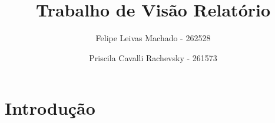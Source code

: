 \documentclass{article}
\title{Trabalho de Visão Relatório}
\author{Felipe Leivas Machado - 262528 \and Priscila Cavalli Rachevsky - 261573 }
\begin{document}
\maketitle

\section{Introdução}
\end{document}
